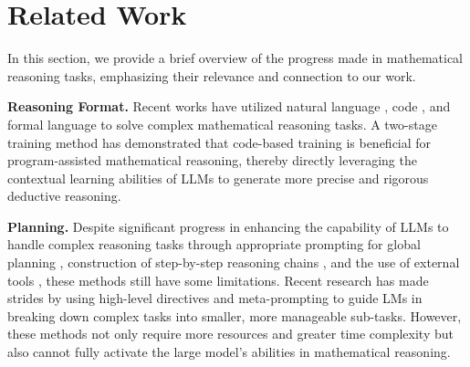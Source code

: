 \documentclass[11pt]{article}
\begin{document}
\section{Related Work}


In this section, we provide a brief overview of the progress made in mathematical reasoning tasks, emphasizing their relevance and connection to our work.


\textbf{Reasoning Format.} 
Recent works have utilized natural language \citep{yu2023outcomesupervised, zhangCR2023,zhuRules2023}, code \citep{wuGetMathProgressive2023, yueMAmmoTHBuildingMath2023,wangMathCoderSeamlessCode2023,gouToRAToolIntegratedReasoning2023}, and formal language \citep{gaoGLLaVASolvingGeometric2023, trinhSolvingOlympiadGeometry2024} to solve complex mathematical reasoning tasks. A two-stage training method \citep{shaoDeepSeekMathPushingLimits2024} has demonstrated that code-based training is beneficial for program-assisted mathematical reasoning, thereby directly leveraging the contextual learning abilities of LLMs to generate more precise and rigorous deductive reasoning.

\textbf{Planning.} Despite significant progress in enhancing the capability of LLMs to handle complex reasoning tasks through appropriate prompting for global planning \citep{yaoTreeThoughtsDeliberate2023}, construction of step-by-step reasoning chains \citep{wangMathShepherdLabelFreeStepbyStep2023,khotDecomposedPromptingModular2023}, and the use of external tools \citep{gouToRAToolIntegratedReasoning2023,yueMAmmoTHBuildingMath2023, shaoDeepSeekMathPushingLimits2024}, these methods still have some limitations. Recent research \citep{suzgunMetaPromptingEnhancingLanguage2024} has made strides by using high-level directives and meta-prompting to guide LMs in breaking down complex tasks into smaller, more manageable sub-tasks. However, these methods not only require more resources and greater time complexity but also cannot fully activate the large model's abilities in mathematical reasoning.
\end{document}
